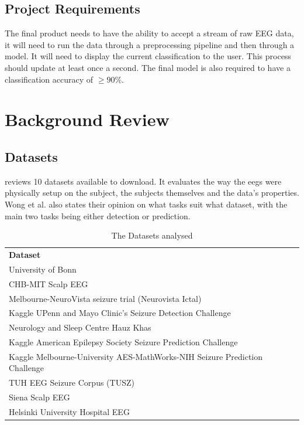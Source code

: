 \documentclass[12pt]{article}
\begin{document}
\subsection{Project Requirements}


The final product needs to have the ability to accept a stream of raw EEG data, it will need to run the data through a preprocessing pipeline and then through a model. It will need to display the current classification to the user. This process should update at least once a second. The final model is also required to have a classification accuracy of $\geq90\%$. 


\section{Background Review}

\subsection{Datasets}\label{datasets}

\cite{wong2023eeg} reviews 10 datasets available to download. It evaluates the way the \acrshort{eegs} were physically setup on the subject, the subjects themselves and the data's properties. Wong et al. also states their opinion on what tasks suit what dataset, with the main two tasks being either detection or prediction. 

\begin{table}[H]
\centering
\begin{tabular}{l}
\textbf{Dataset}                       \\
University of Bonn                   \\
CHB-MIT Scalp EEG                    \\
Melbourne-NeuroVista seizure trial (Neurovista Ictal)                           \\
Kaggle UPenn and Mayo Clinic's Seizure Detection Challenge                     \\
Neurology and Sleep Centre Hauz Khas \\
Kaggle American Epilepsy Society Seizure Prediction Challenge                  \\
Kaggle Melbourne-University AES-MathWorks-NIH Seizure Prediction Challenge \\
TUH EEG Seizure Corpus (TUSZ)        \\
Siena Scalp EEG                      \\
Helsinki University Hospital EEG    
\end{tabular}
\caption{The Datasets analysed}
\end{table}
\end{document}
